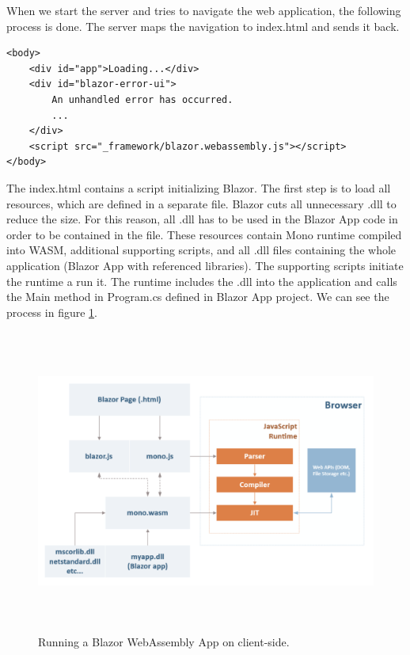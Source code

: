 When we start the server and tries to navigate the web application, the following process is done.
The server maps the navigation to index.html and sends it back.
\par
\begin{minipage}[c]{0.95\textwidth}
\begin{lstlisting}[basicstyle=\small, caption=A Javascript code., label={lst:Javascript}]
<body>
    <div id="app">Loading...</div>
    <div id="blazor-error-ui">
        An unhandled error has occurred.
		...
    </div>
    <script src="_framework/blazor.webassembly.js"></script>
</body>

\end{lstlisting}
\end{minipage}
\par 
The index.html contains a script initializing Blazor.
The first step is to load all resources, which are defined in a separate file.
Blazor cuts all unnecessary .dll to reduce the size.
For this reason, all .dll has to be used in the Blazor App code in order to be contained in the file. 
These resources contain Mono runtime compiled into WASM, additional supporting scripts, and all .dll files containing the whole application (Blazor App with referenced libraries).
The supporting scripts initiate the runtime a run it.
The runtime includes the .dll into the application and calls the Main method in Program.cs defined in Blazor App project.
We can see the process in figure \ref{img02:wasm}.
\par
\begin{figure}[H]\centering
\includegraphics[width=140mm, height=100mm]{./img/BlazorExecution}
\caption{Running a Blazor WebAssembly App on client-side.}
\label{img02:wasm}
\end{figure}

